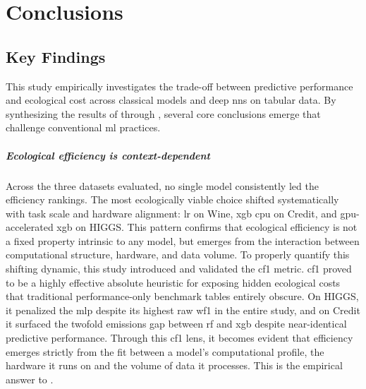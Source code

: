 \chapter{Conclusions}
\label{conclusion}

\section{Key Findings}
\label{sec:summary}

This study empirically investigates the trade-off between predictive performance and ecological cost across classical models and deep \gls{nn}s on tabular data. By synthesizing the results of  through , several core conclusions emerge that challenge conventional \gls{ml} practices.

\paragraph{Ecological efficiency is context-dependent}
Across the three datasets evaluated, no single model consistently led the efficiency rankings. The most ecologically viable choice shifted systematically with task scale and hardware alignment: \gls{lr} on Wine, \gls{xgb} \gls{cpu} on Credit, and \gls{gpu}-accelerated \gls{xgb} on HIGGS. This pattern confirms that ecological efficiency is not a fixed property intrinsic to any model, but emerges from the interaction between computational structure, hardware, and data volume. To properly quantify this shifting dynamic, this study introduced and validated the \gls{cf1} metric. \Gls{cf1} proved to be a highly effective absolute heuristic for exposing hidden ecological costs that traditional performance-only benchmark tables entirely obscure. On HIGGS, it penalized the \gls{mlp} despite its highest raw \gls{wf1} in the entire study, and on Credit it surfaced the twofold emissions gap between \gls{rf} and \gls{xgb} despite near-identical predictive performance. Through this \gls{cf1} lens, it becomes evident that efficiency emerges strictly from the fit between a model's computational profile, the hardware it runs on and the volume of data it processes. This is the empirical answer to .

